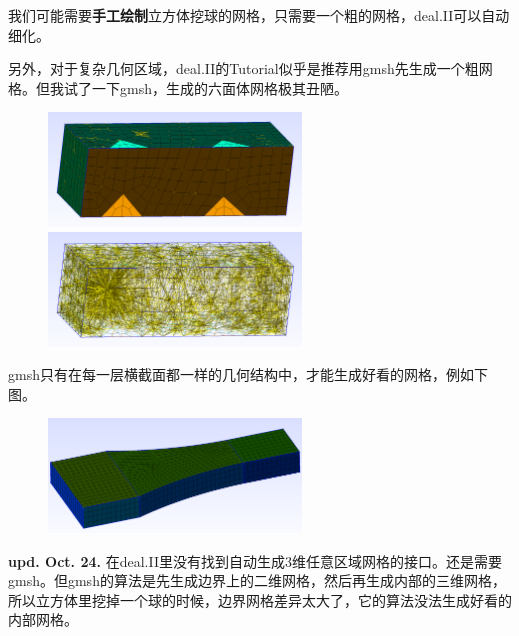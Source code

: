 \documentclass[lang=cn,11pt,a4paper]{elegantpaper}
\begin{document}
我们可能需要\textbf{手工绘制}立方体挖球的网格，只需要一个粗的网格，deal.II可以自动细化。

另外，对于复杂几何区域，deal.II的Tutorial似乎是推荐用gmsh先生成一个粗网格。但我试了一下gmsh，生成的六面体网格极其丑陋。
\begin{figure}[H]
    \centering
    \includegraphics[width=0.6\textwidth]{png/3d-face.png}
    \includegraphics[width=0.6\textwidth]{png/3d-inner.png}
\end{figure}

gmsh只有在每一层横截面都一样的几何结构中，才能生成好看的网格，例如下图。
\begin{figure}[H]
    \centering
    \includegraphics[width=0.6\textwidth]{png/3d-nice.png}
\end{figure}

\textbf{upd. Oct. 24.} 在deal.II里没有找到自动生成3维任意区域网格的接口。还是需要gmsh。但gmsh的算法是先生成边界上的二维网格，然后再生成内部的三维网格，所以立方体里挖掉一个球的时候，边界网格差异太大了，它的算法没法生成好看的内部网格。
\end{document}
